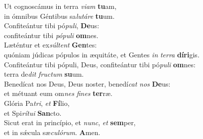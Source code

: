 \evenverse Ut cognoscámus in terra \textit{vi}\textit{am} \textbf{tu}am,~\*\\
\evenverse in ómnibus Géntibus sa\textit{lu}\textit{tá}\textit{re} \textbf{tu}um.\\
\oddverse Confiteántur tibi pó\textit{pu}\textit{li}, \textbf{De}us:~\*\\
\oddverse confiteántur tibi \textit{pó}\textit{pu}\textit{li} \textbf{om}nes.\\
\evenverse Læténtur et ex\textit{súl}\textit{tent} \textbf{Gen}tes:~\*\\
\evenverse quóniam júdicas pópulos in æquitáte, et Gentes \textit{in} \textit{ter}\textit{ra} \textbf{dí}\textbf{ri}gis.\\
\oddverse Confiteántur tibi pópuli, Deus, confiteántur tibi pó\textit{pu}\textit{li} \textbf{om}nes:~\*\\
\oddverse terra de\textit{dit} \textit{fru}\textit{ctum} \textbf{su}um.\\
\evenverse Benedícat nos Deus, Deus noster, benedí\textit{cat} \textit{nos} \textbf{De}us:~\*\\
\evenverse et métuant eum om\textit{nes} \textit{fi}\textit{nes} \textbf{ter}ræ.\\
\oddverse Glória Pa\textit{tri}, \textit{et} \textbf{Fí}lio,~\*\\
\oddverse et Spi\textit{rí}\textit{tu}\textit{i} \textbf{San}cto.\\
\evenverse Sicut erat in princípio, et \textit{nunc}, \textit{et} \textbf{sem}per,~\*\\
\evenverse et in sǽcula sæ\textit{cu}\textit{ló}\textit{rum}. \textbf{A}men.\\
